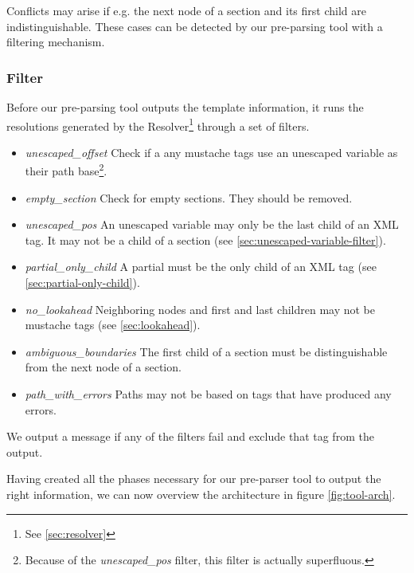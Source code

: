 \documentclass[thesis.tex]{subfiles}
\begin{document}
Conflicts may arise if e.g. the next node of a section and its first child are
indistinguishable. These cases can be detected by our pre-parsing tool with a
filtering mechanism.

\subsubsection{Filter}
\label{sec:filter}
Before our pre-parsing tool outputs the template information, it runs the
resolutions generated by the Resolver\footnote{See \ref{sec:resolver}}
through a set of filters.

\begin{itemize}
\item \emph{unescaped\_offset} Check if a any mustache tags use an unescaped
                               variable as their path base\footnote{
                               	Because of the \emph{unescaped\_pos} filter,
                               	this filter is actually superfluous.
                               }. 
\item \emph{empty\_section} Check for empty sections. They should be removed.
\item \emph{unescaped\_pos} An unescaped variable may only be the last child
                            of an XML tag. It may not be a child of a section
                            (see \ref{sec:unescaped-variable-filter}).
\item \emph{partial\_only\_child} A partial must be the only child of an XML tag
                                  (see \ref{sec:partial-only-child}).
\item \emph{no\_lookahead} Neighboring nodes and first and last children may not
                           be mustache tags (see \ref{sec:lookahead}).
\item \emph{ambiguous\_boundaries} The first child of a section must be
                                   distinguishable from the next node of a
                                   section.
\item \emph{path\_with\_errors} Paths may not be based on tags that have
                                produced any errors.
\end{itemize}

We output a message if any of the filters fail and exclude that tag from the
output.

Having created all the phases necessary for our pre-parser tool to output the
right information, we can now overview the architecture in figure \ref{fig:tool-arch}.
\end{document}
